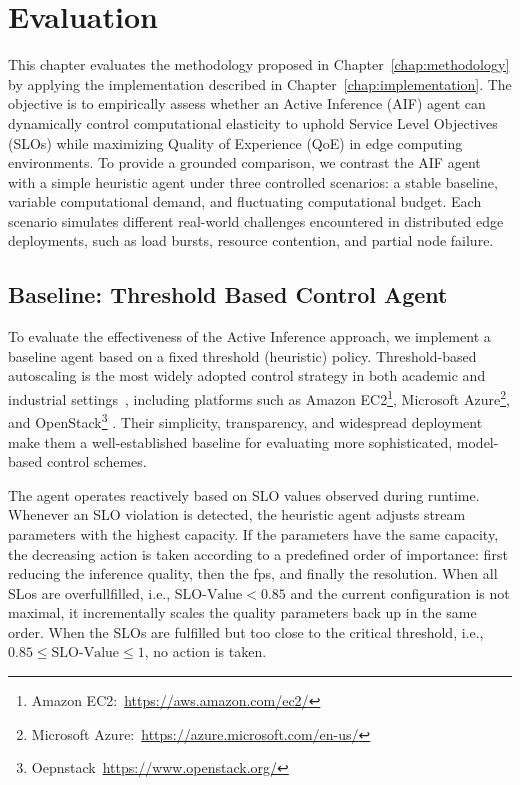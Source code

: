 \chapter{Evaluation}
\label{chap:evaluation}

This chapter evaluates the methodology proposed in Chapter~\ref{chap:methodology} by applying the implementation described in Chapter~\ref{chap:implementation}. The objective is to empirically assess whether an Active Inference (AIF) agent can dynamically control computational elasticity to uphold Service Level Objectives (SLOs) while maximizing Quality of Experience (QoE) in edge computing environments. To provide a grounded comparison, we contrast the AIF agent with a simple heuristic agent under three controlled scenarios: a stable baseline, variable computational demand, and fluctuating computational budget. Each scenario simulates different real-world challenges encountered in distributed edge deployments, such as load bursts, resource contention, and partial node failure.

\section{Baseline: Threshold Based Control Agent}
\label{sec:evaluation-heuristic}

To evaluate the effectiveness of the Active Inference approach, we implement a baseline agent based on a fixed threshold (heuristic) policy. Threshold-based autoscaling is the most widely adopted control strategy in both academic and industrial settings~\cite{arabnejad_comparison_2017}, including platforms such as Amazon EC2\footnote{Amazon EC2:~\url{https://aws.amazon.com/ec2/}}, Microsoft Azure\footnote{Microsoft Azure:~\url{https://azure.microsoft.com/en-us/}}, and OpenStack\footnote{Oepnstack~\url{https://www.openstack.org/}}
. Their simplicity, transparency, and widespread deployment make them a well-established baseline for evaluating more sophisticated, model-based control schemes.

The agent operates reactively based on SLO values observed during runtime. Whenever an SLO violation is detected, the heuristic agent adjusts stream parameters with the highest capacity. If the parameters have the same capacity, the decreasing action is taken according to a predefined order of importance: first reducing the inference quality, then the fps, and finally the resolution. When all SLos are overfullfilled, i.e., \(\text{SLO-Value} < 0.85\) and the current configuration is not maximal, it incrementally scales the quality parameters back up in the same order.
When the SLOs are fulfilled but too close to the critical threshold, i.e., \(0.85 \leq \text{SLO-Value} \leq 1\), no action is taken.

